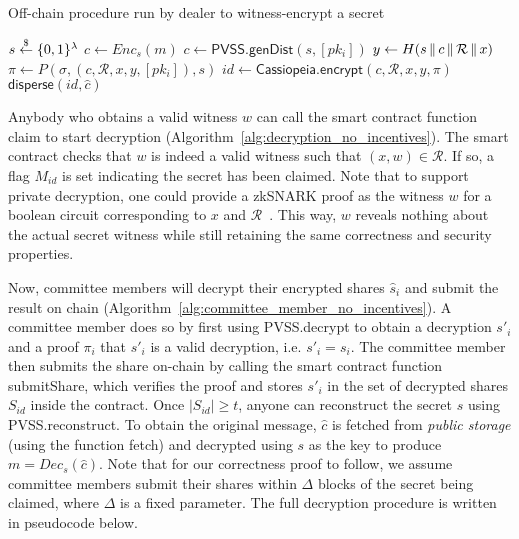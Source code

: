 \begin{algorithm}[h]
\caption{Off-chain procedure run by dealer to witness-encrypt a secret}
\label{alg:dealer_no_incentives}
    \begin{algorithmic}[1]
            \State $s \overset{\$}{\gets} \{0,1\}^{\lambda}$
            \State $\hat{c} \gets Enc_s(m)$
            \State $c \gets \textsf{PVSS.genDist}(s, [pk_i])$
            \State $y \gets H(s \,\|\, c \,\|\, \mathcal{R} \,\|\, x)$
            \State $\pi \gets P(\sigma, (c, \mathcal{R}, x, y, [pk_i]), s)$\label{alg:dealer_no_incentives:proof}
            \State $id \gets \textsf{Cassiopeia.encrypt}(c, \mathcal{R}, x, y, \pi)$
            \State $\textsf{disperse}(id, \hat{c})$ %
        \EndFunction
    \end{algorithmic}
\end{algorithm}

Anybody who obtains a valid witness $w$ can call the smart contract function \textsf{claim} to start decryption (Algorithm~\ref{alg:decryption_no_incentives}).
The smart contract checks that $w$ is indeed a valid witness such that $(x, w) \in \mathcal{R}$.
If so, a flag $M_{id}$ is set indicating the secret has been claimed.
Note that to support private decryption, one could provide a zkSNARK proof as the witness $w$ for a boolean circuit corresponding to $x$ and $\mathcal{R}$~\cite{eweb}.
This way, $w$ reveals nothing about the actual secret witness while still retaining the same correctness and security properties.

Now, committee members will decrypt their encrypted shares $\hat{s}_i$ and submit the result on chain (Algorithm~\ref{alg:committee_member_no_incentives}).
A committee member does so by first using \textsf{PVSS.decrypt} to obtain a decryption $s'_i$ and a proof $\pi_i$ that $s'_i$ is a valid decryption, i.e. $s'_i = s_i$.
The committee member then submits the share on-chain by calling the smart contract function \textsf{submitShare}, which verifies the proof and stores $s'_i$ in the set of decrypted shares $S_{id}$ inside the contract.
Once $|S_{id}| \geq t$, anyone can reconstruct the secret $s$ using \textsf{PVSS.reconstruct}.
To obtain the original message, $\hat{c}$ is fetched from \emph{public storage} (using the function \textsf{fetch}) and decrypted using $s$ as the key to produce $m = Dec_s(\hat{c})$.
Note that for our correctness proof to follow, we assume committee members submit their shares within $\Delta$ blocks of the secret being claimed, where $\Delta$ is a fixed parameter.
The full decryption procedure is written in pseudocode below.

